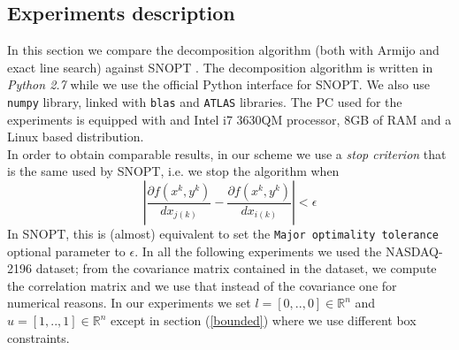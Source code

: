 
\subsection{Experiments description}
In this section we compare the decomposition algorithm (both with Armijo and exact line search) against SNOPT \cite{snopt}.
The decomposition algorithm is written in \textit{Python 2.7} while we use the official Python interface for SNOPT. We also use \texttt{numpy} library, linked with \texttt{blas} and \texttt{ATLAS} libraries. The PC used for the experiments is equipped with and Intel i7 3630QM processor, 8GB of RAM and a Linux based distribution.\\
In order to obtain comparable results, in our scheme we use a \textit{stop criterion} that is the same used by SNOPT, i.e. we stop the algorithm when
\begin{equation}
\left| \frac{\partial f(x^k,y^k)}{d{x_{j(k)}}} - \frac{\partial f(x^k,y^k)}{d{x_{i(k)}} }\right| < \epsilon
\end{equation}
In SNOPT, this is (almost) equivalent to set the \texttt{Major optimality tolerance} optional parameter to $\epsilon$. 
In all the following experiments we used the NASDAQ-2196 dataset\footnotemark[1]; from the covariance matrix contained in the dataset, we compute the correlation matrix and we use that instead of the covariance one for numerical reasons. In our experiments we set $l = [0,..,0] \in \mathbb{R}^n$ and  $u = [1,..,1] \in \mathbb{R}^n$ except in section (\ref{bounded}) where we use different box constraints.

